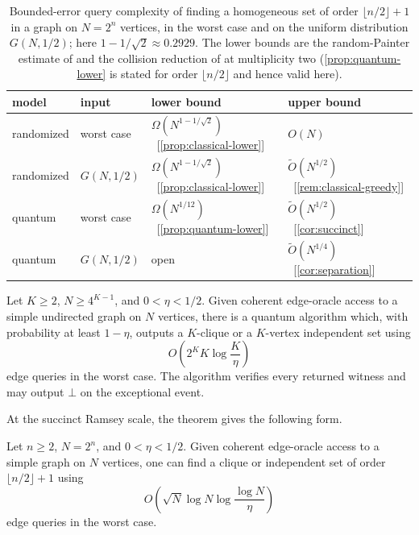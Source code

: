 \begin{table}[t]
\centering
\setlength{\tabcolsep}{4pt}
\begin{tabular}{llll}
\hline
model & input & lower bound & upper bound\\
\hline
randomized & worst case
 & $\Omega(N^{1-1/\sqrt2})$ \ [\cref{prop:classical-lower}]
 & $O(N)$ \ \cite{ErdosSzekeres1935}\\
randomized & $G(N,1/2)$
 & $\Omega(N^{1-1/\sqrt2})$ \ [\cref{prop:classical-lower}]
 & $\widetilde O(N^{1/2})$ \ [\cref{rem:classical-greedy}]\\
quantum & worst case
 & $\Omega(N^{1/12})$ \ [\cref{prop:quantum-lower}]
 & $\widetilde O(N^{1/2})$ \ [\cref{cor:succinct}]\\
quantum & $G(N,1/2)$
 & open
 & $\widetilde O(N^{1/4})$ \ [\cref{cor:separation}]\\
\hline
\end{tabular}
\caption{Bounded-error query complexity of finding a homogeneous set of
order $\lfloor n/2\rfloor+1$ in a graph on $N=2^n$ vertices, in the worst
case and on the uniform distribution $G(N,1/2)$; here
$1-1/\sqrt2\approx0.2929$.  The lower bounds are the random-Painter
estimate of \cite{ConlonFoxGrinshpunHe2019} and the collision reduction of
\cite{JainLiRobereXun2024} at multiplicity two (\cref{prop:quantum-lower}
is stated for order $\lfloor n/2\rfloor$ and hence valid here).}
\label{tab:bounds}
\end{table}

\begin{theorem}
\label{thm:main}
Let $K\ge2$, $N\ge4^{K-1}$, and $0<\eta<1/2$.  Given coherent edge-oracle
access to a simple undirected graph on $N$ vertices, there is a quantum
algorithm which, with probability at least $1-\eta$, outputs a $K$-clique or
a $K$-vertex independent set using
\[
 O\!\left(2^K K\log\frac K\eta\right)
\]
edge queries in the worst case.  The algorithm verifies every returned
witness and may output $\bot$ on the exceptional event.
\end{theorem}

At the succinct Ramsey scale, the theorem gives the following form.

\begin{corollary}\label{cor:succinct}
Let $n\ge2$, $N=2^n$, and $0<\eta<1/2$.  Given coherent edge-oracle access
to a simple graph on $N$ vertices, one can find a clique or independent set
of order $\lfloor n/2\rfloor+1$ using
\[
 O\!\left(
 \sqrt N\log N\log\frac{\log N}{\eta}
 \right)
\]
edge queries in the worst case.
\end{corollary}

